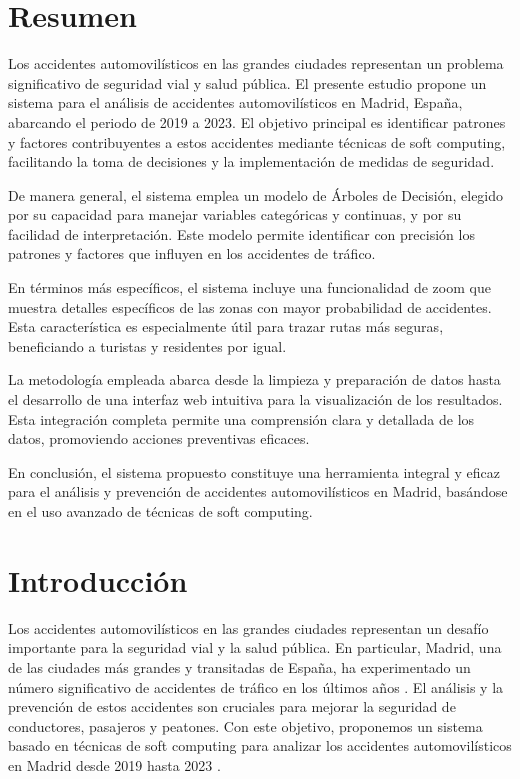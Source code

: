 
\section{Resumen}
Los accidentes automovilísticos en las grandes ciudades representan un problema significativo de seguridad vial y salud pública. El presente estudio propone un sistema para el análisis de accidentes automovilísticos en Madrid, España, abarcando el periodo de 2019 a 2023. El objetivo principal es identificar patrones y factores contribuyentes a estos accidentes mediante técnicas de soft computing, facilitando la toma de decisiones y la implementación de medidas de seguridad.

De manera general, el sistema emplea un modelo de Árboles de Decisión, elegido por su capacidad para manejar variables categóricas y continuas, y por su facilidad de interpretación. Este modelo permite identificar con precisión los patrones y factores que influyen en los accidentes de tráfico.

En términos más específicos, el sistema incluye una funcionalidad de zoom que muestra detalles específicos de las zonas con mayor probabilidad de accidentes. Esta característica es especialmente útil para trazar rutas más seguras, beneficiando a turistas y residentes por igual.

La metodología empleada abarca desde la limpieza y preparación de datos hasta el desarrollo de una interfaz web intuitiva para la visualización de los resultados. Esta integración completa permite una comprensión clara y detallada de los datos, promoviendo acciones preventivas eficaces.

En conclusión, el sistema propuesto constituye una herramienta integral y eficaz para el análisis y prevención de accidentes automovilísticos en Madrid, basándose en el uso avanzado de técnicas de soft computing.

\section{Introducción}
Los accidentes automovilísticos en las grandes ciudades representan un desafío importante para la seguridad vial y la salud pública. En particular, Madrid, una de las ciudades más grandes y transitadas de España, ha experimentado un número significativo de accidentes de tráfico en los últimos años \cite{doi:10.1080/15389588.2012.726384}. El análisis y la prevención de estos accidentes son cruciales para mejorar la seguridad de conductores, pasajeros y peatones. Con este objetivo, proponemos un sistema basado en técnicas de soft computing para analizar los accidentes automovilísticos en Madrid desde 2019 hasta 2023 \cite{monedero2021road}.

